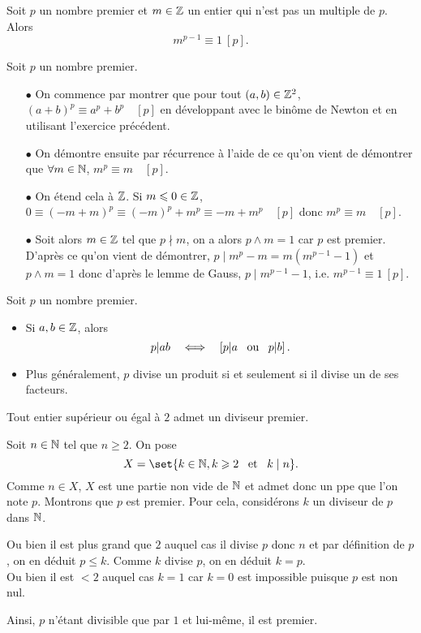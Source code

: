 \documentclass{magnolia}
\begin{document}
\begin{proposition}[nom={Petit théorème de \nom{Fermat}}]
Soit $p$ un nombre premier et $m\in\mathbb{Z}$ un entier qui n'est pas un multiple de
$p$. Alors
\[m^{p-1}\equiv 1\ [p].\]
\end{proposition}

\begin{preuve}
Soit $p$ un nombre premier.
\begin{itemize}
\item[$\bullet$] On commence par montrer que pour tout $(a,b)\in \mathbb{Z}^2$, $(a+b)^p\equiv a^p+b^p \quad [p]$ en développant avec le binôme de Newton et en utilisant l'exercice précédent.
\item[$\bullet$] On démontre ensuite par récurrence à l'aide de ce qu'on vient de démontrer que $\forall m \in \mathbb{N}$, $m^p\equiv m \quad [p]$.
\item[$\bullet$] On étend cela à $\mathbb{Z}$. Si $m\leqslant 0\in \mathbb{Z}$, $0\equiv (-m+m)^p\equiv (-m)^p+m^p \equiv -m+m^p \quad [p]$ donc $m^p\equiv m \quad [p]$.
\item[$\bullet$] Soit alors $m\in \mathbb{Z}$ tel que $p\nmid m$, on a alors $p\wedge m=1$ car $p$ est premier. D'après ce qu'on vient de démontrer, $p\mid m^p-m=m(m^{p-1}-1)$ et $p\wedge m=1$ donc d'après le lemme de Gauss, $p\mid m^{p-1}-1$, i.e. $m^{p-1}\equiv 1\ [p]$.
\end{itemize}
\end{preuve}



\begin{proposition}
Soit $p$ un nombre premier.
\begin{itemize}
\item Si $a,b\in\mathbb{Z}$, alors
  \[p|ab \quad\Longleftrightarrow\quad \left[p|a \quad\!\text{ou}\quad\! p|b\right].\]
\item Plus généralement, $p$ divise un produit si et seulement si il divise
  un de ses facteurs.
\end{itemize}
\end{proposition}

\begin{proposition}
Tout entier supérieur ou égal à $2$ admet un diviseur premier.  
\end{proposition}

\begin{preuve}
Soit $n\in \mathbb{N}$ tel que $n\geq 2$.
On pose $$X=\set{k\in \N, k\geq 2 \et k\mid n}.$$
Comme $n\in X$, $X$ est une partie non vide de $\mathbb{N}$ et admet donc un ppe que l'on note $p$. Montrons que $p$ est premier. Pour cela, considérons $k$ un diviseur de $p$ dans $\mathbb{N}$.

Ou bien il est plus grand que $2$ auquel cas il divise $p$ donc $n$ et par définition de $p$, on en déduit $p\leq k$. Comme $k$ divise $p$, on en déduit $k=p$.\\
Ou bien il est $<2$ auquel cas $k=1$ car $k=0$ est impossible puisque $p$ est non nul.

Ainsi, $p$ n'étant divisible que par $1$ et lui-même, il est premier.
\end{preuve}
\end{document}
